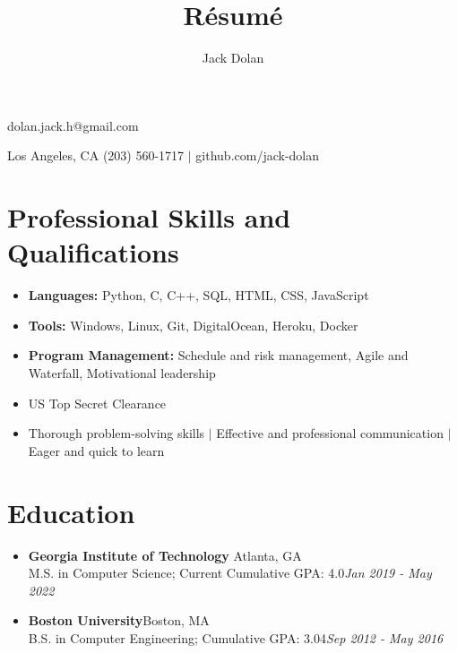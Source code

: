 \documentclass{article}
\makeatletter
\renewcommand{\maketitle}{ 
{\huge\bfseries\theauthor}\hfill dolan.jack.h@gmail.com 

\vspace{0.2em} 

Los Angeles, CA \hfill (203) 560-1717 $|$ github.com/jack-dolan
}
\makeatother
\begin{document}
 
\title{R\'esum\'e} 
\author{Jack Dolan} 
\maketitle
{}


\section{Professional Skills and Qualifications} \begin{itemize}
    \itemsep0em
    \item \textbf{Languages:} Python, C, C++, SQL, HTML, CSS, JavaScript
    \item \textbf{Tools:} Windows, Linux, Git, DigitalOcean, Heroku, Docker
    \item \textbf{Program Management:} Schedule and risk management, Agile and Waterfall, Motivational leadership
    \item US Top Secret Clearance
    \item Thorough problem-solving skills $|$ Effective and professional communication $|$ Eager and quick to learn \end{itemize} 


\section{Education} \begin{itemize}
    \itemsep0.2em
    \item \textbf{Georgia Institute of Technology} \hfill Atlanta, GA\\M.S. in Computer Science; Current Cumulative GPA: 4.0\hfill \emph{Jan 2019 - May 2022}
    \item \textbf{Boston University}\hfill Boston, MA\\B.S. in Computer Engineering; Cumulative GPA: 3.04\hfill \emph{Sep 2012 - May 2016} \end{itemize} 
\end{document}
